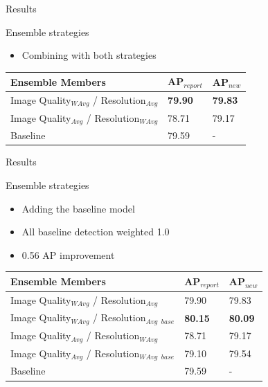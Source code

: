 \begin{frame}{Results}{}
    \begin{block}{Ensemble strategies}
    \begin{itemize}
        \item Combining with both strategies  
    \end{itemize}  
\end{block} 

    \begin{table}[]
    \centering
    \begin{tabular}{|l|l|l|}
    \hline
    \textbf{Ensemble Members} & \textbf{AP$_{report}$} & \textbf{AP$_{new}$} \\ \hline
    Image Quality$_{WAvg}$ / Resolution$_{Avg}$                                           & \textbf{79.90}     & \textbf{79.83}  \\ \hline
    Image Quality$_{Avg}$ / Resolution$_{WAvg}$                                         & 78.71     & 79.17  \\ \hline
    Baseline                                                   & 79.59     & -      \\ \hline
    \end{tabular}
    \end{table}
\end{frame}

\begin{frame}{Results}{}
    \begin{block}{Ensemble strategies}
    \begin{itemize}
        \item Adding the baseline model
        \item All baseline detection weighted 1.0
        \item 0.56 AP improvement
    \end{itemize}  
\end{block} 
    \begin{table}[h]
    \centering
    \begin{tabular}{|l|l|l|}
    \hline
    \textbf{Ensemble Members}                  & \textbf{AP$_{report}$} & \textbf{AP$_{new}$} \\ \hline
    Image Quality$_{WAvg}$ / Resolution$_{Avg}$  & 79.90 & 79.83 \\ \hline
    Image Quality$_{WAvg}$ / Resolution$_{Avg}$ $_{base}$ & \textbf{80.15} & \textbf{80.09} \\ \hline
    Image Quality$_{Avg}$ / Resolution$_{WAvg}$ & 78.71 & 79.17 \\ \hline
    Image Quality$_{Avg}$ / Resolution$_{WAvg}$ $_{base}$ & 79.10 & 79.54\\ \hline
    Baseline                          & 79.59 & -\\ \hline
    \end{tabular}
    \end{table}
\end{frame}

